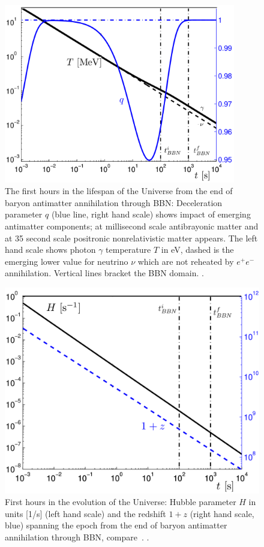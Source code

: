 \begin{figure}
\centerline{\includegraphics[width=0.90\textwidth]{01-introduction/Figures/TqBBN.png}}
\caption{The first hours in the lifespan of the Universe from the end of baryon antimatter annihilation through BBN: Deceleration parameter $q$ (blue line, right hand scale) shows impact of emerging antimatter components; at millisecond scale antibrayonic matter and at 35 second scale positronic nonrelativistic matter appears. The left hand scale shows photon $\gamma$ temperature $T$ in eV, dashed is the emerging lower value for neutrino $\nu$ which are not reheated by $e^+e^-$ annihilation. Vertical lines bracket the BBN domain. . 
\label{fig:BBN}}
\end{figure}

\begin{figure}
\centerline{\includegraphics[width=0.90\linewidth]{01-introduction/Figures/HzBBN.png}} 
\caption{First hours in the evolution of the Universe: Hubble parameter $H$ in units [1/s] (left hand scale) and the redshift $1+z$ (right hand scale, blue) spanning the epoch from the end of baryon antimatter annihilation through BBN, compare~. .
\label{fig:BBN1}}
\end{figure}

